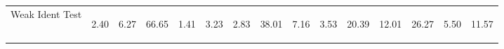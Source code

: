\begin{center}
\begin{tabular}{lcccccccccccccc}
Weak Ident Test  & \begin{normalsize}2.40\end{normalsize} & \begin{normalsize}6.27\end{normalsize} & \begin{normalsize}66.65\end{normalsize} & \begin{normalsize}1.41\end{normalsize} & \begin{normalsize}3.23\end{normalsize} & \begin{normalsize}2.83\end{normalsize} & \begin{normalsize}38.01\end{normalsize} & \begin{normalsize}7.16\end{normalsize} & \begin{normalsize}3.53\end{normalsize} & \begin{normalsize}20.39\end{normalsize} & \begin{normalsize}12.01\end{normalsize} & \begin{normalsize}26.27\end{normalsize} & \begin{normalsize}5.50\end{normalsize} & \begin{normalsize}11.57\end{normalsize}\\

\end{tabular}
\end{center}
